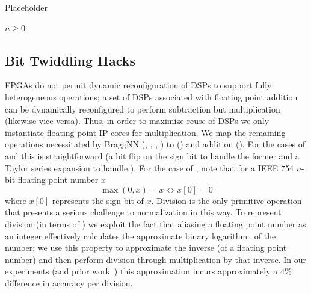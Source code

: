 \begin{algorithm}
	\caption{Placeholder}\label{alg:toposort}
	\begin{algorithmic}
		\Require $n \geq 0$
	\end{algorithmic}
\end{algorithm}

\subsection{Bit Twiddling Hacks}\label{subsec:bit-twiddling-hacks}

FPGAs do not permit dynamic reconfiguration of DSPs to support fully heterogeneous operations; a set of DSPs associated with floating point addition can be dynamically reconfigured to perform subtraction but multiplication (likewise vice-versa).
Thus, in order to maximize reuse of DSPs we only instantiate floating point IP cores for multiplication.
We map the remaining operations necessitated by BraggNN (, , , ) to () and addition ().
For the cases of  and  this is straightforward (a bit flip on the sign bit to handle the former and a Taylor series expansion to handle ).
For the case of , note that for a IEEE 754 $n$-bit floating point number $x$
$$
\max(0, x) = x \iff x[0] = 0
$$
where $x[0]$ represents the sign bit of $x$.
Division is the only primitive operation that presents a serious challenge to normalization in this way.
To represent division (in terms of ) we exploit the fact that aliasing a floating point number as an integer effectively calculates the approximate binary logarithm~\cite{enwiki:1081681080} of the number;
we use this property to approximate the inverse (of a floating point number) and then perform division through multiplication by that inverse.
In our experiments (and prior work~\cite{10.1007/978-0-387-72258-0_14}) this approximation incurs approximately a $4\%$ difference in accuracy per division.

